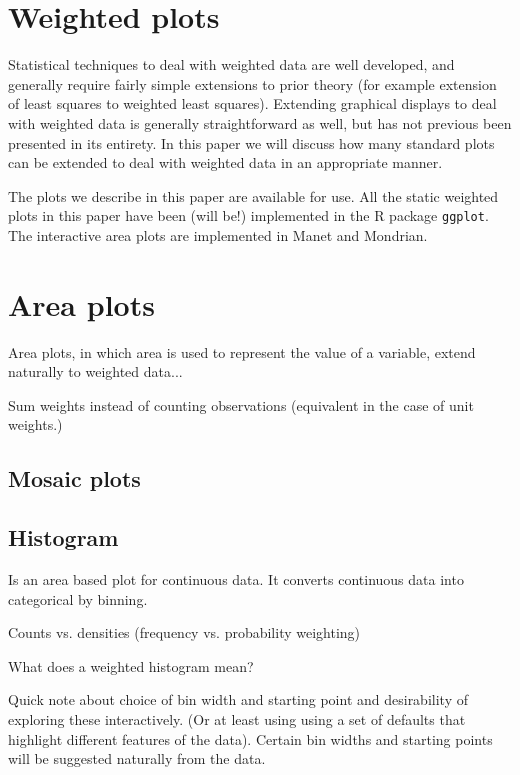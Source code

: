 \documentclass[oneside,letterpaper]{scrartcl}
\begin{document}
\section{Weighted plots}\label{sec:weighted_plots}

Statistical techniques to deal with weighted data are well developed, and generally require fairly simple extensions to prior theory (for example extension of least squares to weighted least squares).  Extending graphical displays to deal with weighted data is generally straightforward as well, but has not previous been presented in its entirety.  In this paper we will discuss how many standard plots can be extended to deal with weighted data in an appropriate manner.  

The plots we describe in this paper are available for use.  All the static weighted plots in this paper have been (will be!) implemented in the R package {\tt ggplot}.  The interactive area plots are implemented in Manet and Mondrian.

\section{Area plots}\label{sec:area_plots}

Area plots, in which area is used to represent the value of a variable, extend naturally to weighted data...

Sum weights instead of counting observations (equivalent in the case of unit weights.)

\subsection{Mosaic plots}\label{sub:mosaic_plots}

\subsection{Histogram}\label{sub:histogram}

Is an area based plot for continuous data.  It converts continuous data into categorical by binning.  
 
Counts vs. densities (frequency vs. probability weighting)

What does a weighted histogram mean? 

Quick note about choice of bin width and starting point and desirability of exploring these interactively.  (Or at least using using a set of defaults that highlight different features of the data).  Certain bin widths and starting points will be suggested naturally from the data.
\end{document}
